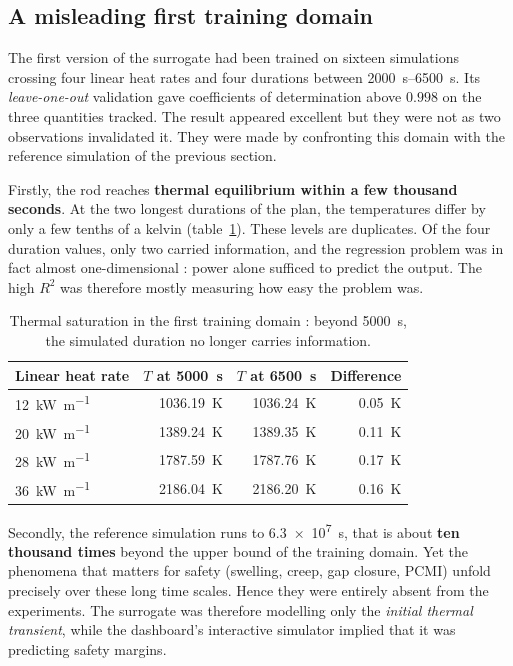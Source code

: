 \documentclass[12pt,a4paper]{report}
\begin{document}
\subsection{A misleading first training domain}

The first version of the surrogate had been trained on sixteen simulations
crossing four linear heat rates and four durations between
\SIrange{2000}{6500}{\second}. Its \textit{leave-one-out} validation gave
coefficients of determination above $0.998$ on the three quantities tracked. The
result appeared excellent but they were not as two observations invalidated it. They were made by confronting this domain with the reference
simulation of the previous section.

Firstly, the rod reaches \textbf{thermal equilibrium within a few thousand
seconds}. At the two longest durations of the plan, the temperatures differ by
only a few tenths of a kelvin (table~\ref{tab:saturation}). These levels are
duplicates. Of the four duration values, only two carried information, and the
regression problem was in fact almost one-dimensional : power alone sufficed to
predict the output. The high $R^2$ was therefore mostly measuring how easy the
problem was.

\begin{table}[htbp]
\centering
\caption[Thermal saturation of the first domain]{Thermal saturation in the first
training domain : beyond \SI{5000}{\second}, the simulated duration no longer
carries information.}
\label{tab:saturation}
\begin{tabularx}{0.8\textwidth}{@{}Xrrr@{}}
\toprule
\textbf{Linear heat rate} & \textbf{$T$ at \SI{5000}{\second}} &
\textbf{$T$ at \SI{6500}{\second}} & \textbf{Difference}\\
\midrule
\SI{12}{\kilo\watt\per\metre} & \SI{1036.19}{\kelvin} & \SI{1036.24}{\kelvin}
  & \SI{0.05}{\kelvin}\\
\SI{20}{\kilo\watt\per\metre} & \SI{1389.24}{\kelvin} & \SI{1389.35}{\kelvin}
  & \SI{0.11}{\kelvin}\\
\SI{28}{\kilo\watt\per\metre} & \SI{1787.59}{\kelvin} & \SI{1787.76}{\kelvin}
  & \SI{0.17}{\kelvin}\\
\SI{36}{\kilo\watt\per\metre} & \SI{2186.04}{\kelvin} & \SI{2186.20}{\kelvin}
  & \SI{0.16}{\kelvin}\\
\bottomrule
\end{tabularx}
\end{table}

Secondly, the reference simulation runs to \SI{6.3e7}{\second}, that
is about \textbf{ten thousand times} beyond the upper bound of the training
domain. Yet the phenomena that matters for safety (swelling, creep, gap closure,
PCMI) unfold precisely over these long time scales. Hence they were entirely absent from the
experiments. The surrogate was therefore modelling only the
\emph{initial thermal transient}, while the dashboard's interactive simulator
implied that it was predicting safety margins.
\end{document}

